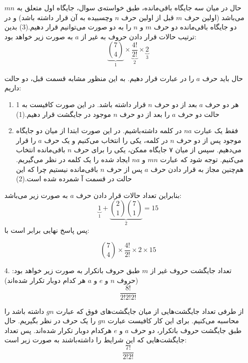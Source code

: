     \p
    حال در میان سه جایگاه باقی‌مانده، طبق خواسته‌ی سوال، جایگاه اول متعلق به $mn$ می‌باشد
    (اولین حرف $m$ قبل از اولین حرف $n$ وچسبیده به آن قرار داشته باشد)
    و در دو جایگاه باقی‌مانده دو حرف $m$ و $n$ را به دو صورت می‌توانیم قرار دهیم.(3)
    \p
    بدین ترتیب حالات قرار دادن حروف به غیر از $a$ به صورت زیر خواهد بود:
    $$\underbrace{{7\choose 4}}_{1} \times \underbrace{\frac{4!}{2!}}_{2} \times \underbrace{2}_{3}$$
    
    حال باید حرف $a$ را در عبارت قرار دهیم.
    به این منظور مشابه قسمت قبل، دو حالت داریم:
    \begin{enumerate}
      \item 
      
      هر دو حرف $a$ بعد از دو حرف $n$ قرار داشته باشد. در این صورت کافیست به 1 حالت دو حرف $a$ را بعد از دو حرف $n$ موجود در جایگشت قرار دهیم.(1)
      \item
      
      فقط یک عبارت $na$ در کلمه داشته‌باشیم. در این صورت ابتدا از میان دو جایگاه موجود پس از دو حرف $n$ در کلمه، یکی را انتخاب می‌کنیم و یک حرف $a$ را قرار می‌دهیم. سپس از میان ۷ جایگاه ممکن، یکی را برای حرف $n$ باقی‌مانده انتخاب می‌کنیم.
      توجه شود که عبارت $mn$ و $na$ ایجاد شده را یک کلمه‌ در نظر می‌گیریم. هم‌چنین مجاز به قرار دادن حرف $a$ پس از حرف $n$ باقی‌مانده نیستیم چرا که این حالت در قسمت آ شمرده شده است.(2)
    \end{enumerate}
    \p
    بنابراین تعداد حالات قرار دادن حرف $a$ به صورت زیر می‌باشد:
    $$\underbrace{1}_{1} + \underbrace{{2\choose 1}{7\choose 1}}_{2} = 15$$ 
    پس پاسخ نهایی برابر است با:
    
    $${7\choose 4} \times \frac{4!}{2!} \times 2 \times 15$$

    4.
    \p
    تعداد جایگشت حروف غیر از $m$
    طبق حروف باتکرار به صورت زیر خواهد بود:
    (حروف $n$ و $e$ و $a$ هر کدام دوبار تکرار شده‌اند)
    $$\frac{8!}{2!2!2!}$$
    
    از طرفی تعداد جایگشت‌هایی از میان جایگشت‌های فوق که عبارت $gn$ داشته باشد را محاسبه می‌کنیم. برای این کار کافیست عبارت $gn$ را یک حرف در نظر بگیریم. حال طبق جایگشت حروف باتکرار، دو حرف $a$ و $e$ هرکدام دوبار تکرار شده‌اند. پس تعداد جایگشت‌هایی که این شرایط را داشته‌باشند به صورت زیر است:
    $$\frac{7!}{2!2!}$$
    
